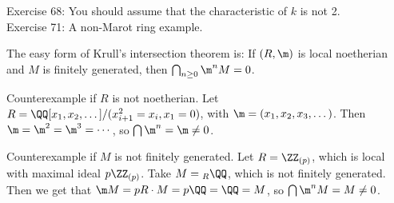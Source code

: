  \noindent
 Exercise 68: You should assume that the characteristic of $k$ is not 2.\\
 Exercise 71: A non-Marot ring example.

 The easy form of Krull's intersection theorem is: If $(R,\m)$ is local noetherian and
 $M$ is finitely generated, then $\bigcap_{n\ge 0} \m^n M=0$.

 \begin{example}
   Counterexample if $R$ is not noetherian. Let $R=\QQ[x_1,x_2,\dots]/(x_{i+1}^2=x_i,x_1=0)$,
   with $\m=(x_1,x_2,x_3,\dots)$. Then $\m=\m^2=\m^3=\cdots$, so $\bigcap \m^n=\m\neq 0$.
 \end{example}
 \begin{example}
   Counterexample if $M$ is not finitely generated. Let $R=\ZZ_{(p)}$, which is local
   with maximal ideal $p\ZZ_{(p)}$. Take $M={}_{R}\QQ$, which is not finitely generated.
   Then we get that $\m M= pR\cdot M = p\QQ=\QQ=M$, so $\bigcap \m^n M=M\neq 0$.
 \end{example}

